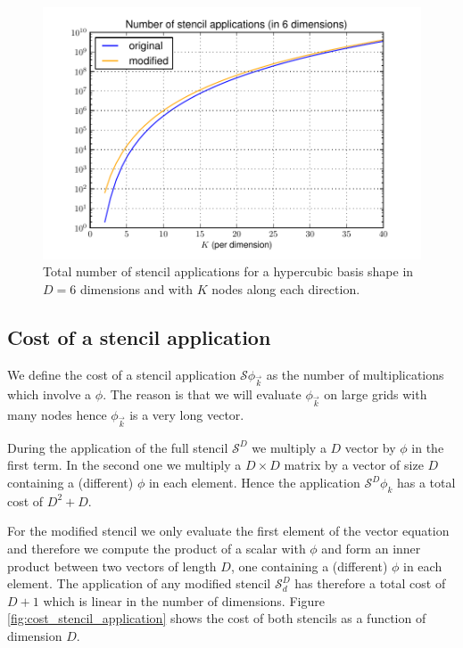 \begin{figure}
  \centering
  \includegraphics[scale=0.5]{./fig/number_stencil_applications.pdf}
  \caption{Total number of stencil applications for a hypercubic basis shape
           in $D=6$ dimensions and with $K$ nodes along each direction.}
  \label{fig:number_stencil_applications}
\end{figure}


\subsection{Cost of a stencil application}


We define the cost of a stencil application $\mathcal{S} \phi_{\vec{k}}$ as the
number of multiplications which involve a $\phi$. The reason is that we will
evaluate $\phi_{\vec{k}}$ on large grids with many nodes hence $\phi_{\vec{k}}$
is a very long vector.

During the application of the full stencil $\mathcal{S}^D$ we multiply a
$D$ vector by $\phi$ in the first term. In the second one we multiply
a $D \times D$ matrix by a vector of size $D$ containing a (different) $\phi$
in each element. Hence the application $\mathcal{S}^D \phi_k$ has a total cost
of $D^2+D$.

For the modified stencil we only evaluate the first element of the vector equation
and therefore we compute the product of a scalar with $\phi$ and form an inner
product between two vectors of length $D$, one containing a (different) $\phi$
in each element. The application of any modified stencil $\mathcal{S}^D_d$ has
therefore a total cost of $D+1$ which is linear in the number of dimensions.
Figure \ref{fig:cost_stencil_application} shows the cost of both stencils
as a function of dimension $D$.


